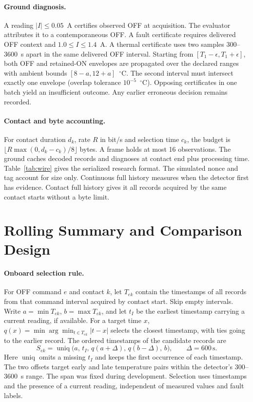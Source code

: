 \documentclass[a4paper]{llncs}
\begin{document}
\paragraph{Ground diagnosis.} A reading $|I|\leq0.05$~A certifies observed OFF at acquisition. The evaluator attributes it to a contemporaneous OFF. A fault certificate requires delivered OFF context and $1.0\leq I\leq1.4$~A. A thermal certificate uses two samples 300--3600~s apart in the same delivered OFF interval. Starting from $[T_1-\epsilon,T_1+\epsilon]$, both OFF and retained-ON envelopes are propagated over the declared ranges with ambient bounds $[8-a,12+a]$~$^\circ$C. The second interval must intersect exactly one envelope (overlap tolerance $10^{-5}$~$^\circ$C). Opposing certificates in one batch yield an insufficient outcome. Any earlier erroneous decision remains recorded.

\paragraph{Contact and byte accounting.} For contact duration $d_k$, rate $R$ in bit/s and selection time $c_k$, the budget is $\lfloor R\max(0,d_k-c_k)/8\rfloor$ bytes. A frame holds at most 16 observations. The ground caches decoded records and diagnoses at contact end plus processing time. Table~\ref{tab:wire} gives the serialized research format. The simulated nonce and tag account for size only. Continuous full history measures when the detector first has evidence. Contact full history gives it all records acquired by the same contact starts without a byte limit.


\section{Rolling Summary and Comparison Design}

\paragraph{Onboard selection rule.}
For OFF command $e$ and contact $k$, let $T_{ek}$ contain the timestamps of all records from that command interval acquired by contact start. Skip empty intervals. Write $a=\min T_{ek}$, $b=\max T_{ek}$, and let $t_I$ be the earliest timestamp carrying a current reading, if available. For a target time $x$, $q(x)=\min\arg\min_{t\in T_{ek}}|t-x|$ selects the closest timestamp, with ties going to the earlier record. The ordered timestamps of the candidate records are
\begin{equation}
 S_{ek}=\operatorname{uniq}\bigl(a,\,t_I,\,q(a+\Delta),\,q(b-\Delta),\,b\bigr),
 \qquad \Delta=600\,\mathrm{s}.
 \label{eq:onboard-summary}
\end{equation}
Here $\operatorname{uniq}$ omits a missing $t_I$ and keeps the first occurrence of each timestamp. The two offsets target early and late temperature pairs within the detector's 300--3600~s range. The span was fixed during development. Selection uses timestamps and the presence of a current reading, independent of measured values and fault labels.
\end{document}
